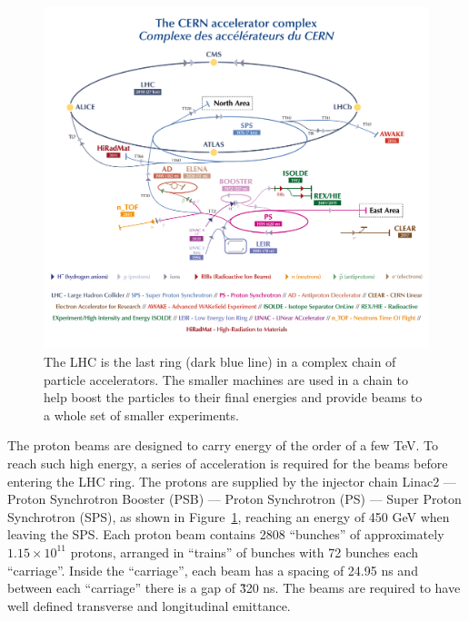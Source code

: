 	\begin{figure}[bht]
		\begin{centering}	
		\includegraphics[width=.75\textwidth]{Detector_plots/accelerator_complex_smaller.png}
		\caption{The LHC is the last ring (dark blue line) in a complex chain of 
		particle accelerators. The smaller machines are used in a chain to help boost 
		the particles to their final energies and provide beams to a whole set of smaller experiments.
			}
		\label{fig:accelerator_complex}
		\end{centering}
	\end{figure}
	The proton beams are designed to carry energy of the order of a few TeV.
	To reach such high energy, a series of acceleration is required for the beams before
	entering the LHC ring. The protons are supplied by the injector chain 
	Linac2 — Proton Synchrotron Booster (PSB) — Proton Synchrotron (PS) — Super Proton Synchrotron (SPS), 
	as shown in Figure~\ref{fig:accelerator_complex}, 
	reaching an energy of 450 GeV when leaving the SPS. 
	Each proton beam contains 2808 ``bunches'' of approximately 
	$1.15 \times 10^{11}$ protons, arranged in 
	``trains'' of bunches with 72 bunches each ``carriage''. 
	Inside the ``carriage'', each beam has a spacing of 24.95 ns and between each 
	``carriage'' there is a gap of \~ 320 ns. 
	The beams are required to have well defined transverse and longitudinal emittance. 


